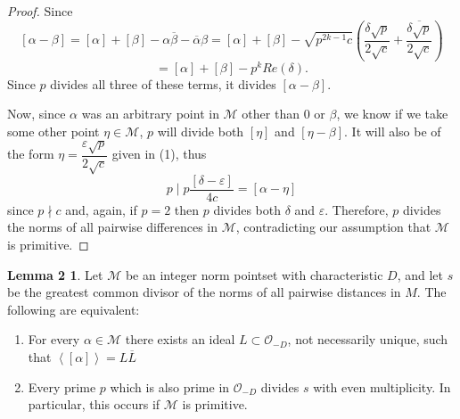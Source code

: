 \documentclass[a4paper]{article}
\theoremstyle{plain}
\theoremstyle{definition}
\newcommand{\thering}
{
\mathcal{O}_{-D}
}
\newcommand{\M}
{
\mathcal{M}
}
\newcommand{\norm}[1]
{
\left[ #1 \right]
}
\newcommand{\conj}[1]
{
\overline{#1}
}
\newcommand{\ideal}[1]
{
\left\langle #1 \right\rangle
}
\newcommand{\conjid}[1]
{
\overline{#1}
}
\newtheorem*{lem2}{Lemma 2}
\begin{document}
\begin{proof}
Since  $$\norm{\alpha - \beta} = \norm{\alpha} + \norm{\beta} - \alpha\conj{\beta} - \conj{\alpha}\beta = \norm{\alpha} + \norm{\beta} - \sqrt{p^{2k-1}c} \left(\frac{\delta\sqrt{p}}{2\sqrt{c}} + \conj{\frac{\delta\sqrt{p}}{2\sqrt{c}}} \right)$$ $$ = \norm{\alpha} + \norm{\beta} - p^kRe(\delta).$$  Since $p$ divides all three of these terms, it divides $\norm{\alpha - \beta}$.

Now, since $\alpha$ was an arbitrary point in $\M$ other than $0$ or $\beta$, we know if we take some other point $\eta \in \M$, $p$ will divide both $\norm{\eta}$ and $\norm{\eta - \beta}$.  It will also be of the form $\eta = \dfrac{\varepsilon\sqrt{p}}{2\sqrt{c}}$ given in (1), thus $$ p \mid p\frac{\norm{\delta - \varepsilon}}{4c} = \norm{\alpha - \eta}$$ since $p \nmid c$ and, again, if $p = 2$ then $p$ divides both $\delta$ and $\varepsilon$.  Therefore, $p$ divides the norms of all pairwise differences in $\M$, contradicting our assumption that $\M$ is primitive.



\end{proof}


\begin{lem2}

Let $\M$ be an integer norm pointset with characteristic $D$, and let $s$ be the greatest common divisor of the norms of all pairwise distances in $M$.  The following are equivalent:
\begin{enumerate}
\item For every $\alpha \in \M$ there exists an ideal $L \subset \thering$, not necessarily unique, such that $\ideal{\norm{\alpha}} = L \conjid{L}$
\item Every prime $p$ which is also prime in $\thering$ divides $s$ with even multiplicity.  In particular, this occurs if $\M$ is primitive.
\end{enumerate}
\end{lem2}
\end{document}
